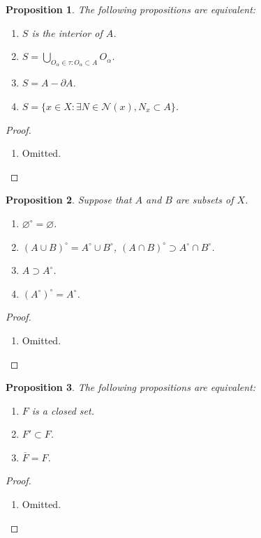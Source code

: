 \documentclass{report}
\newtheorem{proposition}{Proposition}[section]
\theoremstyle{nonumberplain}
\newtheorem{proof}{Proof.}
\begin{document}
\begin{proposition}
	The following propositions are equivalent:
	\begin{enumerate}
		\item $S$ is the interior of $A$.
		\item $S=\bigcup\limits_{O_\alpha\in\tau:O_\alpha\subset A}O_\alpha$.
		\item $S=A-\partial A$.
		\item $S=\{x\in X:\exists N\in\mathcal{N}(x),N_x\subset A\}$.
	\end{enumerate}
\end{proposition}
\begin{proof}~\\ \vspace{-1em}
	\begin{enumerate}
		\item Omitted.
	\end{enumerate}
\end{proof}
\begin{proposition}
	Suppose that $A$ and $B$ are subsets of $X$.
	\begin{enumerate}
		\item $\varnothing^{\circ}=\varnothing$.
		\item $(A \cup B)^{\circ}=A^{\circ}\cup B^{\circ}$,  $(A \cap B)^{\circ}\supset A^{\circ}\cap B^{\circ}$.
		\item $A\supset A^{\circ}$.
		\item $\left(A^{\circ}\right)^{\circ}=A^{\circ}$.
	\end{enumerate}
\end{proposition}

\begin{proof}~\\ \vspace{-1em}
	\begin{enumerate}
		\item Omitted.
	\end{enumerate}
\end{proof}

\begin{proposition}
	The following propositions are equivalent:
	\begin{enumerate}
		\item $F$ is a closed set.
		\item $F'\subset F$.
		\item $\overline{F}=F$.
	\end{enumerate}
\end{proposition}
\begin{proof}~\\ \vspace{-1em}
	\begin{enumerate}
		\item Omitted.
	\end{enumerate}
\end{proof}
\end{document}
